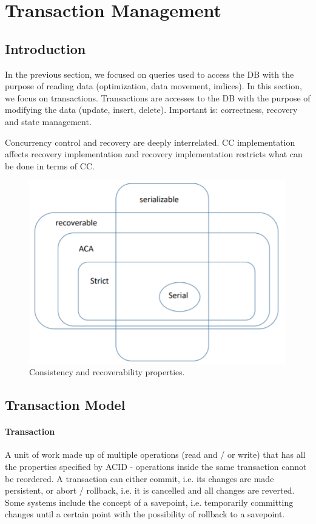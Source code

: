 \section{Transaction Management}

\subsection{Introduction}

In the previous section, we focused on queries used to access the DB with the purpose of reading data (optimization, data movement, indices). In this section, we focus on transactions. Transactions are accesses to the DB with the purpose of modifying the data (update, insert, delete). Important is: correctness, recovery and state management.

Concurrency control and recovery are deeply interrelated. CC implementation affects recovery implementation and recovery implementation restricts what can be done in terms of CC.

\begin{figure}[h]
	\centering
	\includegraphics[scale=0.6]{images/4-histories.PNG}
	\caption{Consistency and recoverability properties.}
	\label{fig:histories}
\end{figure}




\subsection{Transaction Model}

\paragraph{Transaction}
A unit of work made up of multiple operations (read and / or write) that has all the properties specified by ACID - operations inside the same transaction cannot be reordered. A transaction can either commit, i.e. its changes are made persistent, or abort / rollback, i.e. it is cancelled and all changes are reverted. Some systems include the concept of a savepoint, i.e. temporarily committing changes until a certain point with the possibility of rollback to a savepoint.

